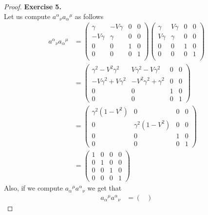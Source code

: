 \documentclass[11pt]{article}
\theoremstyle{definition}
\begin{document}
\cleardoublepage
\begin{proof}{\textbf{Exercise 5.}}\\
Let us compute ${a^\alpha}_\nu {a_\alpha}^\mu$ as follows
\begin{align*}
    {a^\alpha}_\nu {a_\alpha}^\mu
    &= \begin{pmatrix}
        \gamma & -V\gamma & 0 & 0 \\
        -V\gamma & \gamma & 0 & 0 \\
        0 & 0 & 1 & 0 \\
        0 & 0 & 0 & 1 \\
    \end{pmatrix}
    \begin{pmatrix}
        \gamma & V\gamma & 0 & 0 \\
        V\gamma & \gamma & 0 & 0 \\
        0 & 0 & 1 & 0 \\
        0 & 0 & 0 & 1 \\
    \end{pmatrix} \\
    &= \begin{pmatrix}
        \gamma^2 -V^2 \gamma^2 & V\gamma^2 - V\gamma^2 & 0 & 0\\
        -V\gamma^2 + V \gamma^2 & -V^2\gamma^2 + \gamma^2 & 0 & 0\\
        0 & 0 & 1 & 0 \\
        0 & 0 & 0 & 1
    \end{pmatrix} \\
    &= \begin{pmatrix}
        \gamma^2(1 - V^2) & 0 & 0 & 0\\
        0 & \gamma^2(1 - V^2) & 0 & 0\\
        0 & 0 & 1 & 0 \\
        0 & 0 & 0 & 1
    \end{pmatrix} \\
    &= \begin{pmatrix}
        1 & 0 & 0 & 0\\
        0 & 1 & 0 & 0\\
        0 & 0 & 1 & 0 \\
        0 & 0 & 0 & 1
    \end{pmatrix}
\end{align*}
Also, if we compute ${a_\alpha}^\mu{a^\alpha}_\nu$ we get that
\begin{align*}
    {a_\alpha}^\mu{a^\alpha}_\nu
    &= \begin{pmatrix}

\end{pmatrix}
\end{align*}
\end{proof}
\end{document}
